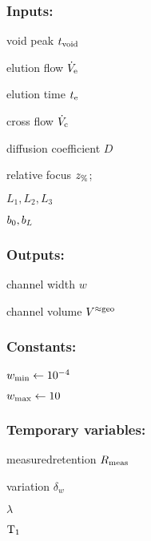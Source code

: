 \subsubsection*{Inputs:}
\begin{multicols}{3}
  \begin{packed_item}
    \item void peak $t_\text{void}$
    \item elution flow $\dot{V}_\text{e}$
    \item elution time $t_\text{e}$
    \item cross flow $\dot{V}_\text{c}$
    \item \small diffusion coefficient \normalsize $D$
    \item relative focus $z_\text{\%}$;
    \item $L_1, L_2, L_3$
    \item $b_0, b_L$
  \end{packed_item}
\end{multicols}

\subsubsection*{Outputs:}
\begin{multicols}{3}
  \begin{packed_item}
    \item channel width $w$
    \item channel volume $V^{\approx\text{geo}}$
  \end{packed_item}
\end{multicols}

\subsubsection*{Constants:}
\begin{multicols}{3}
  \begin{packed_item}
    \item $w_\text{min} \leftarrow 10^{-4}$
    \item  $w_\text{max} \leftarrow 10$
  \end{packed_item}
\end{multicols}

\subsubsection*{Temporary variables:}
\begin{multicols}{3}
  \begin{packed_item}
    \item measured\enspace retention $R_\text{meas}$
    \item variation $δ_w$
    \item $\lambda$
    \item $\text{T}_{1}$
  \end{packed_item}
\end{multicols}

